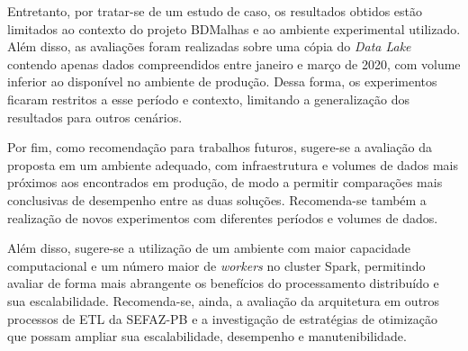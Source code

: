 Entretanto, por tratar-se de um estudo de caso, os resultados obtidos estão limitados ao contexto
do projeto BDMalhas e ao ambiente experimental utilizado. Além disso, as avaliações foram 
realizadas sobre uma cópia do \textit{Data Lake} contendo apenas dados compreendidos entre 
janeiro e março de 2020, com volume inferior ao disponível no ambiente de produção. Dessa forma, 
os experimentos ficaram restritos a esse período e contexto, limitando a generalização dos 
resultados para outros cenários.

Por fim, como recomendação para trabalhos futuros, sugere-se a avaliação da proposta em um 
ambiente adequado, com infraestrutura e volumes de dados mais próximos aos encontrados em 
produção, de modo a permitir comparações mais conclusivas de desempenho entre as duas 
soluções. Recomenda-se também a realização de novos experimentos com diferentes períodos e 
volumes de dados.

Além disso, sugere-se a utilização de um ambiente com maior capacidade computacional e um 
número maior de \textit{workers} no cluster Spark, permitindo avaliar de forma mais abrangente 
os benefícios do processamento distribuído e sua escalabilidade. Recomenda-se, ainda, a avaliação 
da arquitetura em outros processos de ETL da SEFAZ-PB e a investigação de estratégias de 
otimização que possam ampliar sua escalabilidade, desempenho e manutenibilidade.
